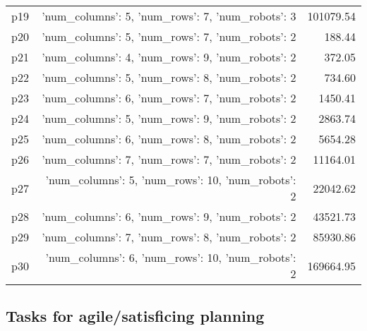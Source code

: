 \documentclass{article}
\begin{document}
\begin{center}
\begin{tabular}{@{}l|r|r@{}}
  p19&{'num\_columns': 5, 'num\_rows': 7, 'num\_robots': 3}&101079.54\\
  p20&{'num\_columns': 5, 'num\_rows': 7, 'num\_robots': 2}&188.44\\
  p21&{'num\_columns': 4, 'num\_rows': 9, 'num\_robots': 2}&372.05\\
  p22&{'num\_columns': 5, 'num\_rows': 8, 'num\_robots': 2}&734.60\\
  p23&{'num\_columns': 6, 'num\_rows': 7, 'num\_robots': 2}&1450.41\\
  p24&{'num\_columns': 5, 'num\_rows': 9, 'num\_robots': 2}&2863.74\\
  p25&{'num\_columns': 6, 'num\_rows': 8, 'num\_robots': 2}&5654.28\\
  p26&{'num\_columns': 7, 'num\_rows': 7, 'num\_robots': 2}&11164.01\\
  p27&{'num\_columns': 5, 'num\_rows': 10, 'num\_robots': 2}&22042.62\\
  p28&{'num\_columns': 6, 'num\_rows': 9, 'num\_robots': 2}&43521.73\\
  p29&{'num\_columns': 7, 'num\_rows': 8, 'num\_robots': 2}&85930.86\\
  p30&{'num\_columns': 6, 'num\_rows': 10, 'num\_robots': 2}&169664.95
                            \end{tabular}
                            \end{center}
                    

                                \subsection*{Tasks for agile/satisficing planning}
                                
\end{document}
